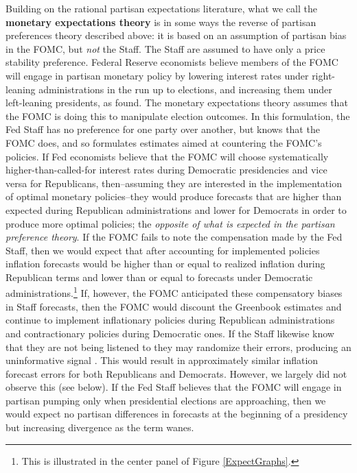 \documentclass[a4paper]{article}
\begin{document}
Building on the rational partisan expectations literature, what we call the {\bf{monetary expectations theory}} is in some ways the reverse of partisan preferences theory described above: it is based on an assumption of partisan bias in the FOMC, but {\emph{not}} the Staff. The Staff are assumed to have only a price stability preference. Federal Reserve economists believe members of the FOMC will engage in partisan monetary policy by lowering interest rates under right-leaning administrations in the run up to elections, and increasing them under left-leaning presidents, as \cite{Clark2012} found. The monetary expectations theory assumes that the FOMC is doing this to manipulate election outcomes. In this formulation, the Fed Staff has no preference for one party over another, but knows that the FOMC does, and so formulates estimates aimed at countering the FOMC's policies. If Fed economists believe that the FOMC will choose systematically higher-than-called-for interest rates during Democratic presidencies and vice versa for Republicans, then--assuming they are interested in the implementation of optimal monetary policies--they would produce forecasts that are higher than expected during Republican administrations and lower for Democrats in order to produce more optimal policies; the {\emph{opposite of what is expected in the partisan preference theory}}. If the FOMC fails to note the compensation made by the Fed Staff, then we would expect that after accounting for implemented policies inflation forecasts would be higher than or equal to realized inflation during Republican terms and lower than or equal to forecasts under Democratic administrations.\footnote{This is illustrated in the center panel of Figure \ref{ExpectGraphs}.} If, however, the FOMC anticipated these compensatory biases in Staff forecasts, then the FOMC would discount the Greenbook estimates and continue to implement inflationary policies during Republican administrations and contractionary policies during Democratic ones. If the Staff likewise know that they are not being listened to they may randomize their errors, producing an uninformative signal \citep{Crawford1982}. This would result in approximately similar inflation forecast errors for both Republicans and Democrats. However, we largely did not observe this (see below). If the Fed Staff believes that the FOMC will engage in partisan pumping only when presidential elections are approaching, then we would expect no partisan differences in forecasts at the beginning of a presidency but increasing divergence as the term wanes.
\end{document}
